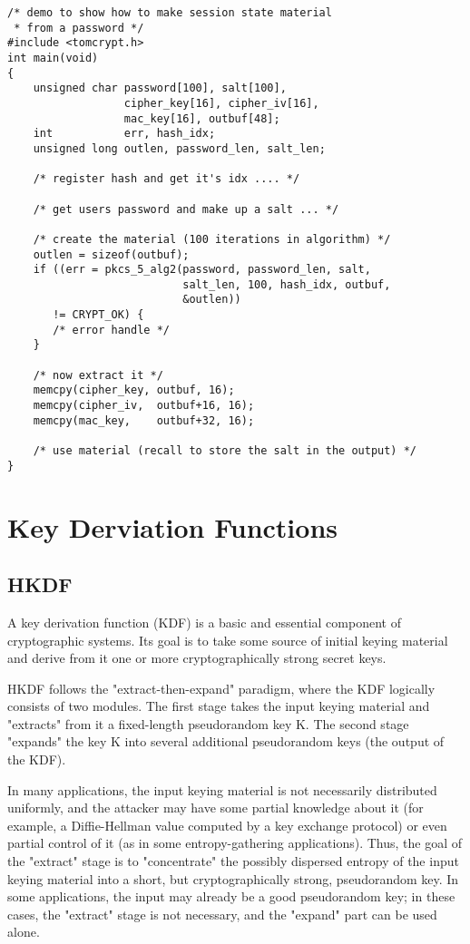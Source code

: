 \documentclass[synpaper]{book}
\newcommand{\mysection}[1]    %
	{                   %
	\section{#1}
   \markboth{\textsf{www.libtom.net}}{\thesection ~ {#1}}
	}
\begin{document}
\begin{verbatim}
/* demo to show how to make session state material
 * from a password */
#include <tomcrypt.h>
int main(void)
{
    unsigned char password[100], salt[100],
                  cipher_key[16], cipher_iv[16],
                  mac_key[16], outbuf[48];
    int           err, hash_idx;
    unsigned long outlen, password_len, salt_len;

    /* register hash and get it's idx .... */

    /* get users password and make up a salt ... */

    /* create the material (100 iterations in algorithm) */
    outlen = sizeof(outbuf);
    if ((err = pkcs_5_alg2(password, password_len, salt,
                           salt_len, 100, hash_idx, outbuf,
                           &outlen))
       != CRYPT_OK) {
       /* error handle */
    }

    /* now extract it */
    memcpy(cipher_key, outbuf, 16);
    memcpy(cipher_iv,  outbuf+16, 16);
    memcpy(mac_key,    outbuf+32, 16);

    /* use material (recall to store the salt in the output) */
}
\end{verbatim}

\mysection{Key Derviation Functions}
\subsection{HKDF}
A key derivation function (KDF) is a basic and essential component of cryptographic systems.  Its goal is to take some source of initial
keying material and derive from it one or more cryptographically strong secret keys.

HKDF follows the "extract-then-expand" paradigm, where the KDF logically consists of two modules.  The first stage takes the input
keying material and "extracts" from it a fixed-length pseudorandom key K.  The second stage "expands" the key K into several additional
pseudorandom keys (the output of the KDF).

In many applications, the input keying material is not necessarily distributed uniformly, and the attacker may have some partial
knowledge about it (for example, a Diffie-Hellman value computed by a key exchange protocol) or even partial control of it (as in some
entropy-gathering applications).  Thus, the goal of the "extract" stage is to "concentrate" the possibly dispersed entropy of the input
keying material into a short, but cryptographically strong, pseudorandom key.  In some applications, the input may already be a
good pseudorandom key; in these cases, the "extract" stage is not necessary, and the "expand" part can be used alone.
\end{document}
